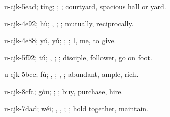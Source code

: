 \begin{multicols}{2}
{\cjkgGlue{}u-cjk-5ead; tíng; \cjkgGlue{}; \cjkgGlue{}; courtyard, spacious hall or yard.

\cjkgGlue{}u-cjk-4e92; hù; \cjkgGlue{}\cjkgGlue{}\cjkgGlue{}, \cjkgGlue{}\cjkgGlue{}\cjkgGlue{}; \cjkgGlue{}; mutually, reciprocally.

\cjkgGlue{}u-cjk-4e88; yú, yǔ; \cjkgGlue{}\cjkgGlue{}\cjkgGlue{}; \cjkgGlue{}; I, me, to give.

\cjkgGlue{}u-cjk-5f92; tú; \cjkgGlue{}, \cjkgGlue{}; \cjkgGlue{}; disciple, follower, go on foot.

\cjkgGlue{}u-cjk-5bcc; fù; \cjkgGlue{}\cjkgGlue{}\cjkgGlue{}, \cjkgGlue{}; \cjkgGlue{}, \cjkgGlue{}; abundant, ample, rich.

\cjkgGlue{}u-cjk-8cfc; gòu; \cjkgGlue{}; \cjkgGlue{}; buy, purchase, hire.

\cjkgGlue{}u-cjk-7dad; wéi; \cjkgGlue{}, \cjkgGlue{}, \cjkgGlue{}; \cjkgGlue{}; hold together, maintain.

}
\end{multicols}
